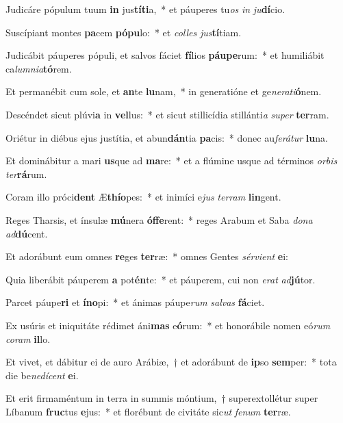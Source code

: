 \item Judicáre pópulum tuum \textbf{in} jus\textbf{tí}\textbf{ti}a,~* et páuperes tu\textit{os} \textit{in} \textit{ju}\textbf{dí}cio.
\item Suscípiant montes \textbf{pa}cem \textbf{pó}\textbf{pu}lo:~* et \textit{col}\textit{les} \textit{jus}\textbf{tí}tiam.
\item Judicábit páuperes pópuli, et salvos fáciet \textbf{fí}lios \textbf{páu}\textbf{pe}rum:~* et humiliábit ca\textit{lum}\textit{ni}\textit{a}\textbf{tó}rem.
\item Et permanébit cum sole, et \textbf{an}te \textbf{lu}nam,~* in generatióne et ge\textit{ne}\textit{ra}\textit{ti}\textbf{ó}nem.
\item Descéndet sicut plúvi\textbf{a} in \textbf{vel}lus:~* et sicut stillicídia stillánti\textit{a} \textit{su}\textit{per} \textbf{ter}ram.
\item Oriétur in diébus ejus justítia, et abun\textbf{dán}tia \textbf{pa}cis:~* donec au\textit{fe}\textit{rá}\textit{tur} \textbf{lu}na.
\item Et dominábitur a mari \textbf{us}que ad \textbf{ma}re:~* et a flúmine usque ad términos \textit{or}\textit{bis} \textit{ter}\textbf{rá}rum.
\item Coram illo próci\textbf{dent} Æ\textbf{thí}\textbf{o}pes:~* et inimíci e\textit{jus} \textit{ter}\textit{ram} \textbf{lin}gent.
\item Reges Tharsis, et ínsulæ \textbf{mú}nera \textbf{óf}\textbf{fe}rent:~* reges Arabum et Saba \textit{do}\textit{na} \textit{ad}\textbf{dú}cent.
\item Et adorábunt eum omnes \textbf{re}ges \textbf{ter}ræ:~* omnes Gentes \textit{sér}\textit{vi}\textit{ent} \textbf{e}i:
\item Quia liberábit páuperem \textbf{a} pot\textbf{én}te:~* et páuperem, cui non \textit{e}\textit{rat} \textit{ad}\textbf{jú}tor.
\item Parcet páupe\textbf{ri} et \textbf{ín}\textbf{o}pi:~* et ánimas páupe\textit{rum} \textit{sal}\textit{vas} \textbf{fá}ciet.
\item Ex usúris et iniquitáte rédimet áni\textbf{mas} e\textbf{ó}rum:~* et honorábile nomen eó\textit{rum} \textit{co}\textit{ram} \textbf{il}lo.
\item Et vivet, et dábitur ei de auro Arábiæ,~† et adorábunt de \textbf{ip}so \textbf{sem}per:~* tota die be\textit{ne}\textit{dí}\textit{cent} \textbf{e}i.
\item Et erit firmaméntum in terra in summis móntium,~† superextollétur super Líbanum \textbf{fruc}tus \textbf{e}jus:~* et florébunt de civitáte sic\textit{ut} \textit{fe}\textit{num} \textbf{ter}ræ.
